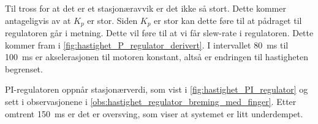 Til tross for at det er et stasjonæravvik er det ikke så stort. Dette kommer antageligvis av at $K_p$ er stor. Siden $K_p$ er stor kan dette føre til at pådraget til regulatoren går i metning. Dette vil føre til at vi får slew-rate i regulatoren. Dette kommer fram i \autoref{fig:hastighet_P_regulator_derivert}. I intervallet \SI{80}{\milli\second} til \SI{100}{\milli\second} er akselerasjonen til motoren konstant, altså er endringen til hastigheten begrenset.

PI-regulatoren oppnår stasjonærverdi, som vist i \autoref{fig:hastighet_PI_regulator} og sett i observasjonene i \ref{obs:hastighet_regulator_breming_med_finger}. Etter omtrent \SI{150}{\milli\second} er det er oversving, som viser at systemet er litt underdempet. 

